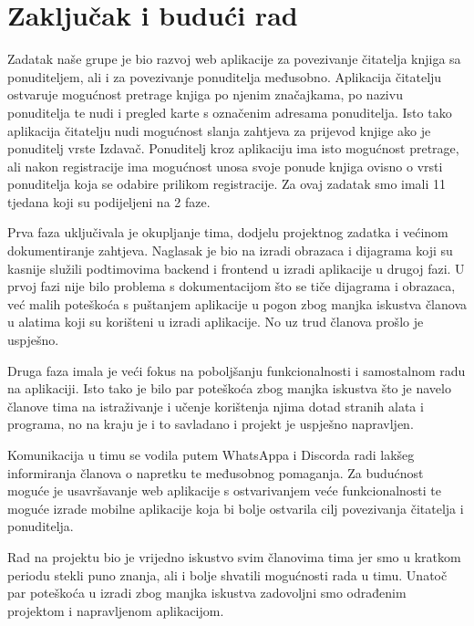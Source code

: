 \chapter{Zaključak i budući rad}
		
		Zadatak naše grupe je bio razvoj web aplikacije za povezivanje čitatelja knjiga sa ponuditeljem, ali i za povezivanje ponuditelja međusobno. Aplikacija čitatelju ostvaruje mogućnost pretrage knjiga po njenim značajkama, po nazivu ponuditelja te nudi i pregled karte s označenim adresama ponuditelja. Isto tako aplikacija čitatelju nudi mogućnost slanja zahtjeva za prijevod knjige ako je ponuditelj vrste Izdavač. Ponuditelj kroz aplikaciju ima isto mogućnost pretrage, ali nakon registracije ima mogućnost unosa svoje ponude knjiga ovisno o vrsti ponuditelja koja se odabire prilikom registracije. Za ovaj zadatak smo imali 11 tjedana koji su podijeljeni na 2 faze. 
		
		Prva faza uključivala je okupljanje tima, dodjelu projektnog zadatka i većinom dokumentiranje zahtjeva. Naglasak je bio na izradi obrazaca i dijagrama koji su kasnije služili podtimovima backend i frontend u izradi aplikacije u drugoj fazi. U prvoj fazi nije bilo problema s dokumentacijom što se tiče dijagrama i obrazaca, već malih poteškoća s puštanjem aplikacije u pogon zbog manjka iskustva članova u alatima koji su korišteni u izradi aplikacije. No uz trud članova prošlo je uspješno.
		
		Druga faza imala je veći fokus na poboljšanju funkcionalnosti i samostalnom radu na aplikaciji. Isto tako je bilo par poteškoća zbog manjka iskustva što je navelo članove tima na istraživanje i učenje korištenja njima dotad stranih alata i programa, no na kraju je i to savladano i projekt je uspješno napravljen.
		
		Komunikacija u timu se vodila putem WhatsAppa i Discorda radi lakšeg informiranja članova o napretku te međusobnog pomaganja. Za budućnost moguće je usavršavanje web aplikacije s ostvarivanjem veće funkcionalnosti te moguće izrade mobilne aplikacije koja bi bolje ostvarila cilj povezivanja čitatelja i ponuditelja.
		
		Rad na projektu bio je vrijedno iskustvo svim članovima tima jer smo u kratkom periodu stekli puno znanja, ali i bolje shvatili mogućnosti rada u timu. Unatoč par poteškoća u izradi zbog manjka iskustva zadovoljni smo odrađenim projektom i napravljenom aplikacijom.
		
		
		\eject 